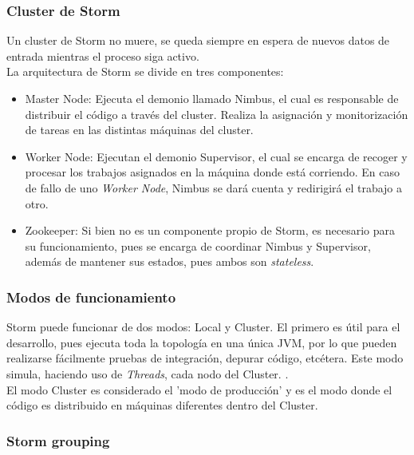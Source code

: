 	\subsubsection{Cluster de Storm}
	\label{subsubsec:clusterStorm}

	Un cluster de Storm no muere, se queda siempre en espera de nuevos datos de entrada mientras el proceso siga activo.\\

	La arquitectura de Storm se divide en tres componentes:
	\begin{itemize}
	\item Master Node: Ejecuta el demonio llamado Nimbus, el cual es responsable de distribuir el código a través del cluster. Realiza la asignación y monitorización de tareas en las distintas máquinas del cluster.
	\item Worker Node: Ejecutan el demonio Supervisor, el cual se encarga de recoger y procesar los trabajos asignados en la máquina donde está corriendo. En caso de fallo de uno \textit{Worker Node}, Nimbus se dará cuenta y redirigirá el trabajo a otro.
	\item Zookeeper: Si bien no es un componente propio de Storm, es necesario para su funcionamiento, pues se encarga de coordinar Nimbus y Supervisor, además de mantener sus estados, pues ambos son \textit{stateless}.
	\end{itemize}

	\subsubsection{Modos de funcionamiento}
	\label{subsubsec:modoFuncionamientoStorm}

	Storm puede funcionar de dos modos: Local y Cluster. El primero es útil para el desarrollo, pues ejecuta toda la topología en una única JVM, por lo que pueden realizarse fácilmente pruebas de integración, depurar código, etcétera. Este modo simula, haciendo uso de \textit{Threads}, cada nodo del Cluster. \cite{Storm}.\\

	El modo Cluster es considerado el 'modo de producción' y es el modo donde el código es distribuido en máquinas diferentes dentro del Cluster.

	\subsubsection{Storm grouping}
	\label{subsubsec:StormGrouping}


